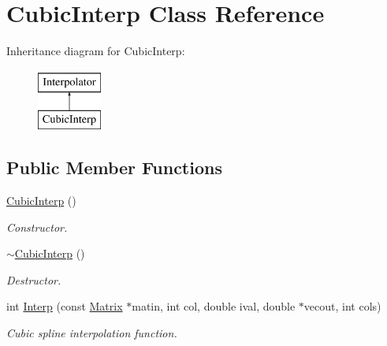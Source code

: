 \hypertarget{classCubicInterp}{
\section{CubicInterp Class Reference}
\label{dd/de9/classCubicInterp}
}
Inheritance diagram for CubicInterp:\begin{figure}[H]
\begin{center}
\leavevmode
\includegraphics[height=2cm]{dd/de9/classCubicInterp}
\end{center}
\end{figure}
\subsection*{Public Member Functions}
\begin{DoxyCompactItemize}
\item 
\hypertarget{classCubicInterp_a4eb9093b962cbe527df14938016ea1a6}{
\hyperlink{classCubicInterp_a4eb9093b962cbe527df14938016ea1a6}{CubicInterp} ()}
\label{dd/de9/classCubicInterp_a4eb9093b962cbe527df14938016ea1a6}

\begin{DoxyCompactList}\small\item\em Constructor. \item\end{DoxyCompactList}\item 
\hypertarget{classCubicInterp_a57dd187897a0729518521a76c9f22818}{
\hyperlink{classCubicInterp_a57dd187897a0729518521a76c9f22818}{$\sim$CubicInterp} ()}
\label{dd/de9/classCubicInterp_a57dd187897a0729518521a76c9f22818}

\begin{DoxyCompactList}\small\item\em Destructor. \item\end{DoxyCompactList}\item 
int \hyperlink{classCubicInterp_a19da3e57e56c37f0b83f37f7217a8a0c}{Interp} (const \hyperlink{classMatrix}{Matrix} $\ast$matin, int col, double ival, double $\ast$vecout, int cols)
\begin{DoxyCompactList}\small\item\em Cubic spline interpolation function. \item\end{DoxyCompactList}\end{DoxyCompactItemize}


